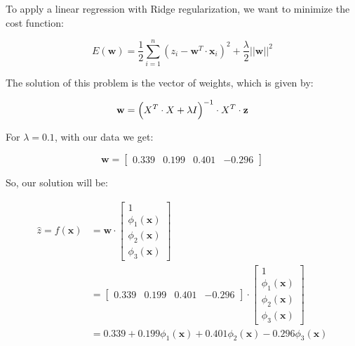\documentclass[12pt]{article}
\begin{document}
\begin{enumerate}[leftmargin=\labelsep]
\begin{enumerate}
        To apply a linear regression with Ridge regularization, we want to minimize the cost function:

        \begin{equation}
            E(\mathbf{w}) = \frac{1}{2}\sum_{i=1}^{n}(z_i - \mathbf{w}^T \cdot \mathbf{x}_i)^2 + \frac{\lambda}{2} ||\mathbf{w}||^2
        \end{equation}

        The solution of this problem is the vector of weights, which is given by:

        \begin{equation}
            \mathbf{w} = \Bigl(  X^T \cdot X + \lambda I\Bigr)^{-1} \cdot X^T \cdot \mathbf{z}
        \end{equation}

        For $\lambda = 0.1$, with our data we get:

        \begin{equation}
            \mathbf{w} = \begin{bmatrix}
                0.339 & 0.199 & 0.401 & -0.296
            \end{bmatrix}
        \end{equation}

        So, our solution will be:

        \begin{equation}
        \begin{split}
            \hat{z} = f(\mathbf{x}) &= \mathbf{w} \cdot
            \begin{bmatrix}
                1 \\
                \phi_1(\mathbf{x}) \\
                \phi_2(\mathbf{x}) \\
                \phi_3(\mathbf{x})
            \end{bmatrix} \\
            &= \begin{bmatrix}
                0.339 & 0.199 & 0.401 & -0.296
            \end{bmatrix} \cdot \begin{bmatrix}
                1 \\
                \phi_1(\mathbf{x}) \\
                \phi_2(\mathbf{x}) \\
                \phi_3(\mathbf{x})
            \end{bmatrix} \\
            &= 0.339 + 0.199\phi_1(\mathbf{x}) + 0.401\phi_2(\mathbf{x}) - 0.296\phi_3(\mathbf{x})
        \end{split}
        \end{equation}


\end{enumerate}
\end{enumerate}
\end{document}
